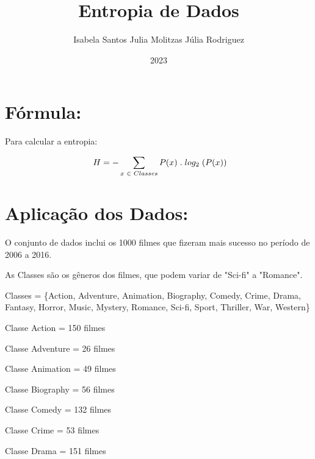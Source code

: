 \documentclass{article}
\title{Entropia de Dados}
\author{Isabela Santos \hspace{0.1cm} Julia Molitzas \hspace{0.1cm} Júlia Rodriguez}
\date{2023}
\begin{document}
\maketitle

\newpage

\section{Fórmula:}

Para calcular a entropia:

\[
\ H = - \sum_{x  \hspace{0.1cm} \in  \hspace{0.1cm} Classes}P(x)\hspace{0.1cm} . \hspace{0.1cm} log_2 \hspace{0.1cm} (P(x))\]\newline

\section{Aplicação dos Dados:}

O conjunto de dados inclui os 1000 filmes que fizeram mais sucesso no período de 2006 a 2016.\newline

As Classes são os gêneros dos filmes, que podem variar de "Sci-fi" a "Romance".\newline


Classes = \{Action, Adventure, Animation, Biography, Comedy, Crime, Drama, Fantasy, Horror, Music, Mystery, Romance, Sci-fi, Sport, Thriller, War, Western\}\newline 

Classe Action = 150 filmes \newline

Classe Adventure = 26 filmes \newline

Classe Animation = 49 filmes \newline

Classe Biography = 56 filmes \newline

Classe Comedy = 132 filmes \newline

Classe Crime = 53 filmes \newline

Classe Drama = 151 filmes \newline
\end{document}
